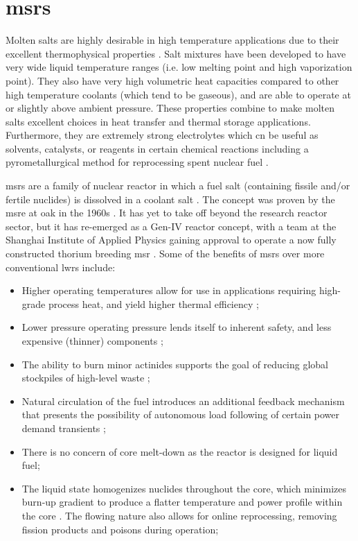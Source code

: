\section{\texorpdfstring{\aclp{msr}}{Molten Salt Reactors}}
Molten salts are highly desirable in high temperature applications due to their excellent thermophysical properties \cite{RoperReview}. Salt mixtures have been developed to have very wide liquid temperature ranges (i.e. low melting point and high vaporization point). They also have very high volumetric heat capacities compared to other high temperature coolants (which tend to be gaseous), and are able to operate at or slightly above ambient pressure. These properties combine to make molten salts excellent choices in heat transfer and thermal storage applications. Furthermore, they are extremely strong electrolytes which cn be useful as solvents, catalysts, or reagents in certain chemical reactions including a pyrometallurgical method for reprocessing spent nuclear fuel \cite{Simpson}.

\acfp{msr} are a family of nuclear reactor in which a fuel salt (containing fissile and/or fertile nuclides) is dissolved in a coolant salt \cite{RoperOverview}. The concept was proven by the \acf{msre} at \acf{oak} in the 1960s \cite{MSRE}. It has yet to take off beyond the research reactor sector, but it has re-emerged as a Gen-IV reactor concept, with a team at the Shanghai Institute of Applied Physics gaining approval to operate a now fully constructed thorium breeding \acs{msr} \cite{china}. Some of the benefits of \acsp{msr} over more conventional \acsp{lwr} include:
\begin{itemize}
    \item Higher operating temperatures allow for use in applications requiring high-grade process heat, and yield higher thermal efficiency \cite{RoperOverview};
    \item Lower pressure operating pressure lends itself to inherent safety, and less expensive (thinner) components \cite{RoperReview};
    \item The ability to burn minor actinides supports the goal of reducing global stockpiles of high-level waste \cite{RoperReview};
    \item Natural circulation of the fuel introduces an additional feedback mechanism that presents the possibility of autonomous load following of certain power demand transients \cite{CarterNumerical};
    \item There is no concern of core melt-down as the reactor is designed for liquid fuel;
    \item The liquid state homogenizes nuclides throughout the core, which minimizes burn-up gradient to produce a flatter temperature and power profile within the core \cite{Lamarsh,TodreasKazimi1}. The flowing nature also allows for online reprocessing, removing fission products and poisons during operation;
\end{itemize}

